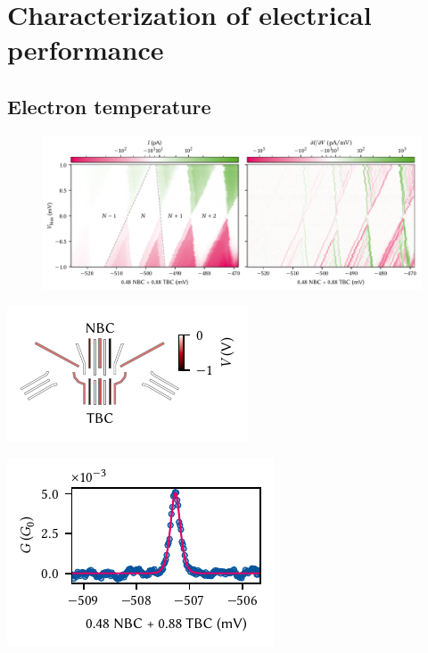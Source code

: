 \chapter{Characterization of electrical performance}\label{ch:setup:electrical}

\section{Electron temperature}\label{sec:setup:electrical:etemp}
\begin{figure}
    \centering
    \includegraphics{img/pdf/setup/diamonds}
    \caption[]{}
    \label{fig:}
\end{figure}

\begin{marginfigure}
    \centering
    \includegraphics{img/pdf/setup/diamonds_gl}
    \caption[]{}
    \label{fig:}
\end{marginfigure}

\begin{marginfigure}
    \centering
    \includegraphics{img/pdf/setup/coulomb_resonance}
    \caption[]{}
    \label{fig:}
\end{marginfigure}

